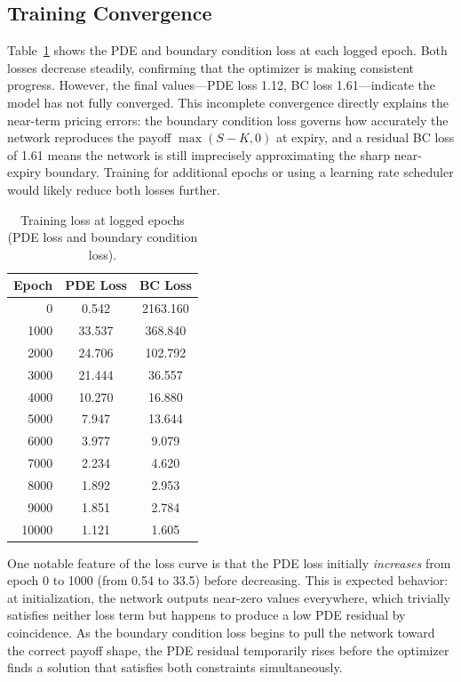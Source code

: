 \documentclass[11pt, twocolumn]{article}
\begin{document}
\subsection{Training Convergence}

Table~\ref{tab:training} shows the PDE and boundary condition loss at each logged epoch. Both losses decrease steadily, confirming that the optimizer is making consistent progress. However, the final values---PDE loss 1.12, BC loss 1.61---indicate the model has not fully converged. This incomplete convergence directly explains the near-term pricing errors: the boundary condition loss governs how accurately the network reproduces the payoff $\max(S-K,0)$ at expiry, and a residual BC loss of 1.61 means the network is still imprecisely approximating the sharp near-expiry boundary. Training for additional epochs or using a learning rate scheduler would likely reduce both losses further.

\begin{table}[h]
\centering
\small
\caption{Training loss at logged epochs (PDE loss and boundary condition loss).}
\label{tab:training}
\begin{tabular}{rcc}
\toprule
Epoch & PDE Loss & BC Loss \\
\midrule
0      & 0.542  & 2163.160 \\
1000   & 33.537 & 368.840  \\
2000   & 24.706 & 102.792  \\
3000   & 21.444 & 36.557   \\
4000   & 10.270 & 16.880   \\
5000   & 7.947  & 13.644   \\
6000   & 3.977  & 9.079    \\
7000   & 2.234  & 4.620    \\
8000   & 1.892  & 2.953    \\
9000   & 1.851  & 2.784    \\
10000  & 1.121  & 1.605    \\
\bottomrule
\end{tabular}
\end{table}

One notable feature of the loss curve is that the PDE loss initially \textit{increases} from epoch 0 to 1000 (from 0.54 to 33.5) before decreasing. This is expected behavior: at initialization, the network outputs near-zero values everywhere, which trivially satisfies neither loss term but happens to produce a low PDE residual by coincidence. As the boundary condition loss begins to pull the network toward the correct payoff shape, the PDE residual temporarily rises before the optimizer finds a solution that satisfies both constraints simultaneously.
\end{document}
